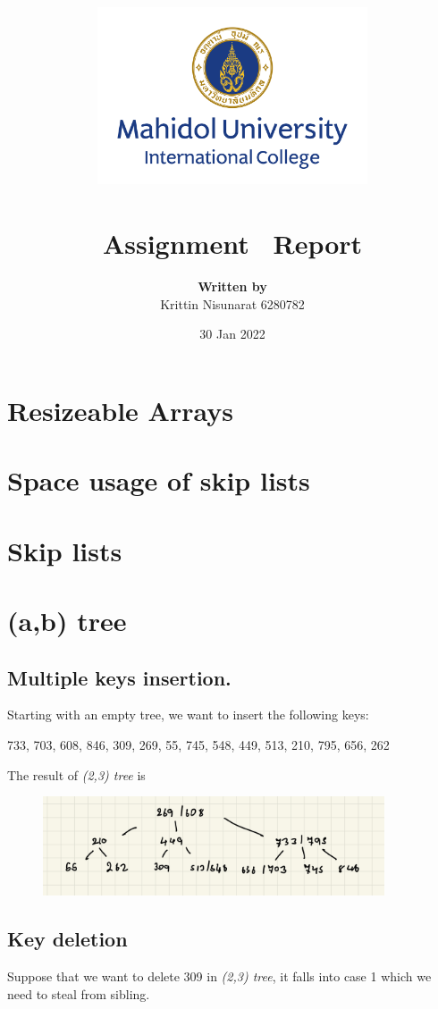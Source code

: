 \documentclass[a4paper, 12pt]{report}
\title{
	{\includegraphics[width=80mm,scale=0.5]{MUIC_Logo_Eng_Center.png}} \\
	{\textbf{\mySubject}}\\
	{\large Assignment \myhwnum \ Report}\\
}
\author{
	{\textbf{Written by}} \\ 
	{Krittin Nisunarat 6280782}
}
\date{30 Jan 2022}
\begin{document}
\maketitle
\tableofcontents

\chapter{Resizeable Arrays}

\chapter{Space usage of skip lists}

\chapter{Skip lists}

\chapter{(a,b) tree}

\section{Multiple keys insertion.}

Starting with an empty tree, we want to insert the following keys:
\begin{center}
        733, 703, 608, 846, 309, 269, 55, 745, 548, 449, 513, 210, 795, 656, 262
\end{center}

The result of \emph{(2,3) tree} is

\begin{figure}[h]
        \centering
        \includegraphics[width=0.9\textwidth,scale=0.5]{tree_insertion.jpeg}
\end{figure}

\section{Key deletion}

\noindent Suppose that we want to delete 309 in \emph{(2,3) tree}, it falls into case 1 which 
we need to steal from sibling.
\end{document}
